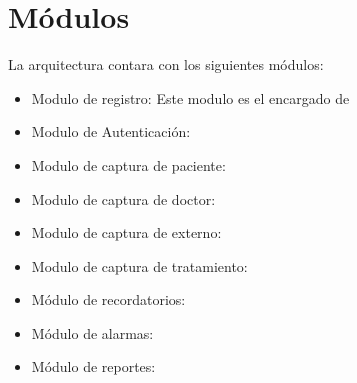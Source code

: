 \section{Módulos}
La arquitectura contara con los siguientes módulos:
\begin{itemize}
	\item Modulo de registro: Este modulo es el encargado de 
	
	
	\item Modulo de Autenticación:
	\item Modulo de captura de paciente:
	\item Modulo de captura de doctor:
	\item Modulo de captura de externo:
	\item Modulo de captura de tratamiento:
	\item Módulo de recordatorios:
	\item Módulo de alarmas:
	\item Módulo de reportes:
	
	
	
	
	
\end{itemize}

%
%
%
%

